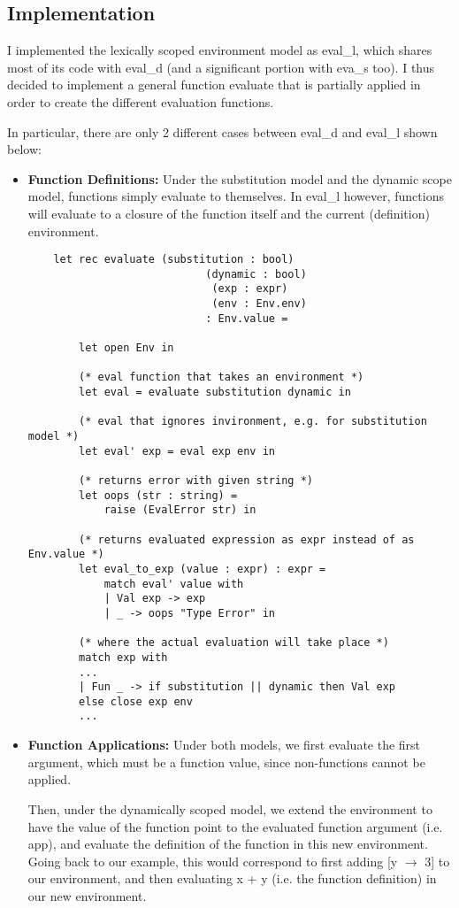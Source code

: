 \documentclass[submit]{harvardml}
\begin{document}
\subsection*{Implementation}
I implemented the lexically scoped environment model as eval\_l, which shares most of its code with eval\_d (and a significant portion with eva\_s too). I thus decided to implement a general function evaluate that is partially applied in order to create the different evaluation functions.

In particular, there are only 2 different cases between eval\_d and eval\_l shown below:

\begin{itemize}
	\item \textbf{Function Definitions:} Under the substitution model and the dynamic scope model, functions simply evaluate to themselves. In eval\_l however, functions will evaluate to a closure of the function itself and the current (definition) environment.
	\begin{lstlisting}
	let rec evaluate (substitution : bool)
						    (dynamic : bool)
							 (exp : expr)
							 (env : Env.env)
							: Env.value =
							
		let open Env in
		
		(* eval function that takes an environment *)
		let eval = evaluate substitution dynamic in
		
		(* eval that ignores invironment, e.g. for substitution model *)
		let eval' exp = eval exp env in
		
		(* returns error with given string *)
		let oops (str : string) =
			raise (EvalError str) in
		
		(* returns evaluated expression as expr instead of as Env.value *)
		let eval_to_exp (value : expr) : expr =
			match eval' value with
			| Val exp -> exp
			| _ -> oops "Type Error" in
			
		(* where the actual evaluation will take place *)
		match exp with
		...
		| Fun _ -> if substitution || dynamic then Val exp
		else close exp env
		...
	\end{lstlisting}
	\item \textbf{Function Applications:} Under both models, we first evaluate the first argument, which must be a function value, since non-functions cannot be applied.
	
	Then, under the dynamically scoped model, we extend the environment to have the value of the function point to the evaluated function argument (i.e. app), and evaluate the definition of the function in this new environment. Going back to our example, this would correspond to first adding [y $\rightarrow$ 3] to our environment, and then evaluating x + y (i.e. the function definition) in our new environment.
	

\end{itemize}
\end{document}
